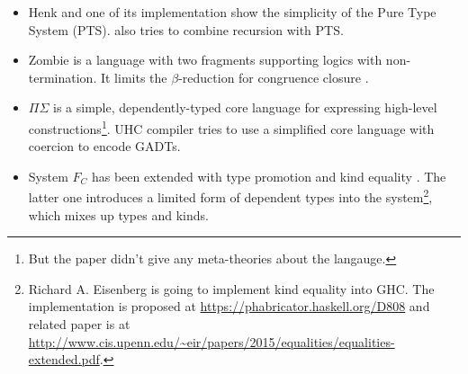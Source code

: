 \begin{itemize}
\item Henk \cite{pts:henk} and one of its implementation \cite{pts:fp} show the simplicity of the Pure Type System (PTS). \cite{pts:rec} also tries to combine recursion with PTS.

\item \textsf{Zombie} \cite{zombie:popl14, zombie:thesis} is a language with two fragments supporting logics with non-termination. It limits the $\beta$-reduction for congruence closure \cite{zombie:popl15}.

\item $\Pi\Sigma$ \cite{dep:pisigma} is a simple, dependently-typed core language for expressing high-level constructions\footnote{But the paper didn't give any meta-theories about the langauge.}. UHC compiler \cite{fc:uhc} tries to use a simplified core language with coercion to encode GADTs.

\item System $F_C$ \cite{fc} has been extended with type promotion \cite{fc:pro} and kind equality \cite{fc:kind}. The latter one introduces a limited form of dependent types into the system\footnote{Richard A. Eisenberg is going to implement kind equality \cite{fc:kind} into GHC. The implementation is proposed at \url{https://phabricator.haskell.org/D808} and related paper is at \url{http://www.cis.upenn.edu/~eir/papers/2015/equalities/equalities-extended.pdf}.}, which mixes up types and kinds.
\end{itemize}
